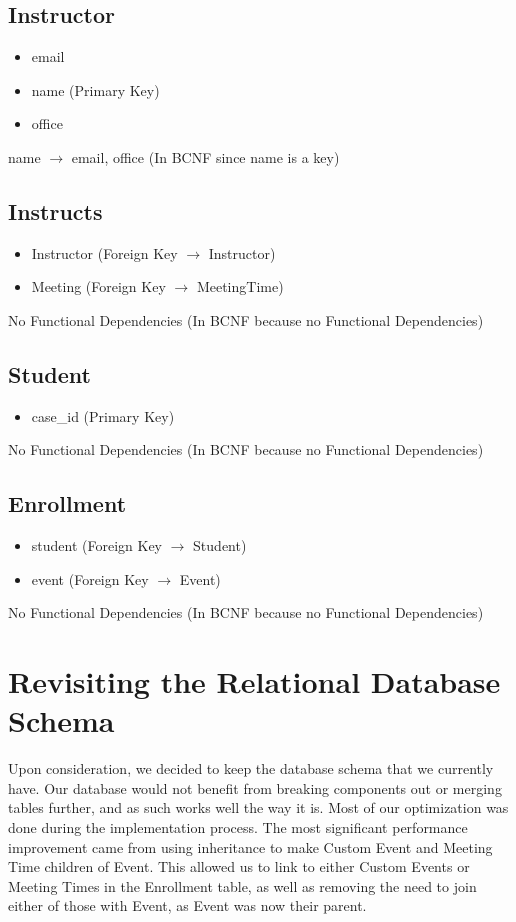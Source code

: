 \documentclass[pdftex,12pt,letter]{article}
\begin{document}
\subsection*{Instructor}
\begin{itemize}
\item email
\item name (Primary Key)
\item office
\end{itemize}
name $\rightarrow$ email, office (In BCNF since name is a key)
\subsection*{Instructs}
\begin{itemize}
\item Instructor (Foreign Key $\rightarrow$ Instructor)
\item Meeting (Foreign Key $\rightarrow$ MeetingTime)
\end{itemize}
No Functional Dependencies (In BCNF because no Functional Dependencies)
\subsection*{Student}
\begin{itemize}
\item case\_id (Primary Key)
\end{itemize}
No Functional Dependencies (In BCNF because no Functional Dependencies)
\subsection*{Enrollment}
\begin{itemize}
\item student (Foreign Key $\rightarrow$ Student)
\item event (Foreign Key $\rightarrow$ Event)
\end{itemize}
No Functional Dependencies (In BCNF because no Functional Dependencies)
\section{Revisiting the Relational Database Schema}
Upon consideration, we decided to keep the database schema that we currently have. Our database would not benefit from breaking components out or merging tables further, and as such works well the way it is. Most of our optimization was done during the implementation process. The most significant performance improvement came from using inheritance to make Custom Event and Meeting Time children of Event. This allowed us to link to either Custom Events or Meeting Times in the Enrollment table, as well as removing the need to join either of those with Event, as Event was now their parent.
\end{document}
